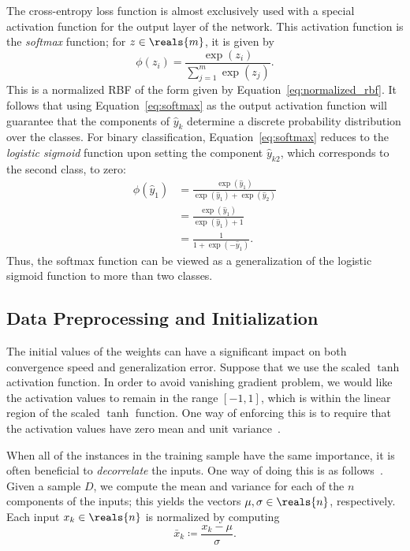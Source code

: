 \documentclass[11pt,a4paper]{article}
\numberwithin{equation}{section}
\begin{document}
The cross-entropy loss function is almost exclusively used with a special
activation function for the output layer of the network. This activation
function is the \emph{softmax} function; for $z \in \reals{m}$, it is given by
\begin{equation}
	\phi(z_i) = \frac{\exp(z_i)}{\sum_{j = 1}^m \exp(z_j)}.
	\label{eq:softmax}
\end{equation}
This is a normalized RBF of the form given by Equation~\ref{eq:normalized_rbf}.
It follows that using Equation~\ref{eq:softmax} as the output activation
function will guarantee that the components of $\hat{y}_k$ determine a discrete
probability distribution over the classes. For binary classification,
Equation~\ref{eq:softmax} reduces to the \emph{logistic sigmoid} function upon
setting the component $\hat{y}_{k2}$, which corresponds to the second class, to
zero:
\begin{align*}
	\phi(\hat{y}_1)
	&= \frac{\exp(\hat{y}_1)}{\exp(\hat{y}_1) + \exp(\hat{y}_2)} \\
	&= \frac{\exp(\hat{y}_1)}{\exp(\hat{y}_1) + 1} \\
	&= \frac{1}{1 + \exp(-\hat{y}_1)}.
\end{align*}
Thus, the softmax function can be viewed as a generalization of the logistic
sigmoid function to more than two classes.

\subsection{Data Preprocessing and Initialization}

The initial values of the weights can have a significant impact on both
convergence speed and generalization error. Suppose that we use the scaled
$\tanh$ activation function. In order to avoid vanishing gradient problem, we
would like the activation values to remain in the range $[-1, 1]$, which is
within the linear region of the scaled $\tanh$ function. One way of enforcing
this is to require that the activation values have zero mean and unit
variance~\citep{lecun-98b}.

When all of the instances in the training sample have the same importance, it is
often beneficial to \emph{decorrelate} the inputs. One way of doing this is as
follows~\citep{lecun-98b}. Given a sample $D$, we compute the mean and variance
for each of the $n$ components of the inputs; this yields the vectors $\mu,
\sigma \in \reals{n}$, respectively. Each input $x_k \in \reals{n}$ is
normalized by computing
\[
	\bar{x}_k \coloneqq \frac{x_k - \mu}{\sigma}.
\]
\end{document}

